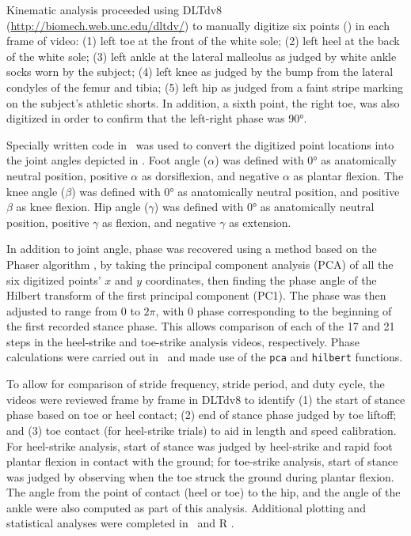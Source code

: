 Kinematic analysis proceeded using \citet{hedrick2008software} DLTdv8 (\url{http://biomech.web.unc.edu/dltdv/}) to manually digitize six points () in each frame of video: (1) left toe at the front of the white sole; (2) left heel at the back of the white sole; (3) left ankle at the lateral malleolus as judged by white ankle socks worn by the subject; (4) left knee as judged by the bump from the lateral condyles of the femur and tibia; (5) left hip as judged from a faint stripe marking on the subject's athletic shorts. In addition, a sixth point, the right toe, was also digitized in order to confirm that the left-right phase was \ang{90}. 

Specially written code in \Matlab\ was used to convert the digitized point locations into the joint angles depicted in . Foot angle ($\alpha$) was defined with \ang{0} as anatomically neutral position, positive $\alpha$ as dorsiflexion, and negative $\alpha$ as plantar flexion. The knee angle ($\beta$) was defined with \ang{0} as anatomically neutral position, and positive $\beta$ as knee flexion. Hip angle ($\gamma$) was defined with \ang{0} as anatomically neutral position, positive $\gamma$ as flexion, and negative $\gamma$ as extension. 

In addition to joint angle, phase was recovered using a method based on the Phaser algorithm \citep{revzen2008estimating}, by taking the principal component analysis (PCA) of all the six digitized points' $x$ and $y$ coordinates, then finding the phase angle of the Hilbert transform of the first principal component (PC1). The phase was then adjusted to range from 0 to $2\pi$, with 0 phase corresponding to the beginning of the first recorded stance phase. This allows comparison of each of the 17 and 21 steps in the heel-strike and toe-strike analysis videos, respectively. Phase calculations were carried out in \Matlab\ and made use of the \lstinline{pca} and \lstinline{hilbert} functions. 

To allow for comparison of stride frequency, stride period, and duty cycle, the videos were reviewed frame by frame in DLTdv8 to identify (1) the start of stance phase based on toe or heel contact; (2) end of stance phase judged by toe liftoff; and (3) toe contact (for heel-strike trials) to aid in length and speed calibration.  For heel-strike analysis, start of stance was judged by heel-strike and rapid foot plantar flexion in contact with the ground; for toe-strike analysis, start of stance was judged by observing when the toe struck the ground during plantar flexion. The angle from the point of contact (heel or toe) to the hip, and the angle of the ankle were also computed as part of this analysis. Additional plotting and statistical analyses were completed in \Matlab\ and R \citep{r2020}. 


